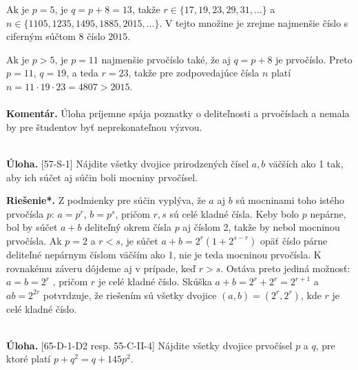 \documentclass[11pt,a4paper,oneside,final]{book}
\newcommand{\kom}{\textbf{Komentár.} }
\newcommand{\ul}{\textbf{Úloha.} }
\newcommand{\rieh}{\textbf{Riešenie*.} }
\begin{document}
Ak je $p = 5$, je $q = p + 8 = 13$, takže $r \in \{17, 19, 23, 29, 31, \ldots \}$ a $n \in \{1 105,1 235, 1 495, 1 885, 2 015, \ldots\}$. V tejto množine je zrejme najmenšie číslo s ciferným súčtom 8 číslo $2 015$.

Ak je $p > 5$, je $p = 11$ najmenšie prvočíslo také, že aj $q = p + 8$ je prvočíslo. Preto $p = 11$, $q = 19$, a teda $r = 23$, takže pre zodpovedajúce čísla $n$ platí $n = 11 \cdot 19 \cdot 23= 4 807 > 2 015$.\\
\\
\kom Úloha príjemne spája poznatky o deliteľnosti a prvočíslach a nemala by pre študentov byť neprekonateľnou výzvou.\\
\\
\begin{tcolorbox}[breakable,notitle,boxrule=0pt,colback=light-gray,colframe=light-gray]\ul [57-S-1]
Nájdite všetky dvojice prirodzených čísel $a, b$ väčších ako 1 tak, aby ich súčet aj súčin boli mocniny prvočísel.

\end{tcolorbox}

\rieh Z podmienky pre súčin vyplýva, že $a$ aj $b$ sú mocninami toho istého prvočísla $p$: $a = p^r$, $b = p^s$, pričom $r, s$ sú celé kladné čísla. Keby bolo $p$ nepárne, bol by súčet $a + b$ deliteľný okrem čísla $p$ aj číslom 2, takže by nebol mocninou prvočísla. Ak $p = 2$ a $r < s$, je súčet $a + b = 2^r (1 + 2^{s-r})$ opäť číslo párne deliteľné nepárnym číslom väčším ako 1, nie je teda mocninou prvočísla. K rovnakému záveru dôjdeme aj v prípade, keď $r > s$. Ostáva preto jediná možnosť: $a = b = 2^r$ , pričom $r$ je celé kladné číslo. Skúška $a+b = 2^r +2^r = 2^{r+1}$ a $ab = 2^{2r}$ potvrdzuje, že riešením sú všetky dvojice $(a, b) = (2^r, 2^r)$, kde $r$ je celé kladné číslo.\\
\\
\begin{tcolorbox}[breakable,notitle,boxrule=0pt,colback=light-gray,colframe=light-gray]\ul [65-D-1-D2 resp. 55-C-II-4] Nájdite všetky dvojice prvočísel $p$ a $q$, pre ktoré platí $p + q^2= q + 145p^2$.

\end{tcolorbox}
\end{document}
